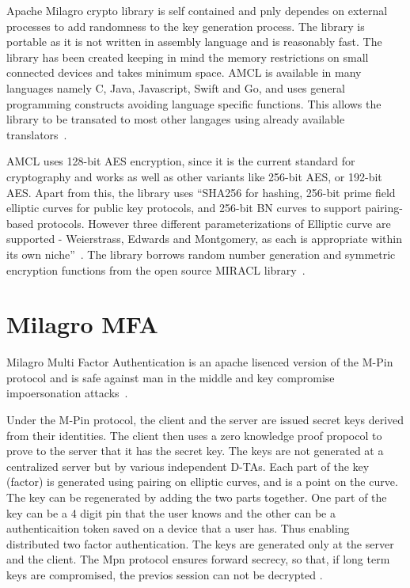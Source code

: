 Apache Milagro crypto library is self contained and pnly dependes on
external processes to add randomness to the key generation
process. The library is portable as it is not written in assembly
language and is reasonably fast. The library has been created keeping
in mind the memory restrictions on small connected devices and takes
minimum space. AMCL is available in many languages namely C, Java,
Javascript, Swift and Go, and uses general programming constructs
avoiding language specific functions. This allows the library to be
transated to most other langages using already available
translators~\cite{mcl-white-paper}.

AMCL uses 128-bit AES encryption, since it is the current standard for
cryptography and works as well as other variants like 256-bit AES, or
192-bit AES. Apart from this, the library uses ``SHA256 for hashing,
256-bit prime field elliptic curves for public key protocols, and
256-bit BN curves to support pairing-based protocols. However three
different parameterizations of Elliptic curve are supported -
Weierstrass, Edwards and Montgomery, as each is appropriate within its
own niche''~\cite{mcl-white-paper}. The library borrows random number
generation and symmetric encryption functions from the open source
MIRACL library~\cite{mcl-white-paper}.


\section{Milagro MFA}

Milagro Multi Factor Authentication is an apache lisenced version of
the M-Pin protocol and is safe against man in the middle and key
compromise impoersonation attacks~\cite{milagro-mfa}.

Under the M-Pin protocol, the client and the server are issued secret
keys derived from their identities. The client then uses a zero
knowledge proof propocol to prove to the server that it has the secret
key. The keys are not generated at a centralized server but by various
independent D-TAs. Each part of the key (factor) is generated using
pairing on elliptic curves, and is a point on the curve. The key can
be regenerated by adding the two parts together. One part of the key
can be a 4 digit pin that the user knows and the other can be a
authenticaition token saved on a device that a user has. Thus enabling
distributed two factor authentication. The keys are generated only at
the server and the client. The Mpn protocol ensures forward secrecy,
so that, if long term keys are compromised, the previos session can
not be decrypted \cite{milagro-protocols}.

